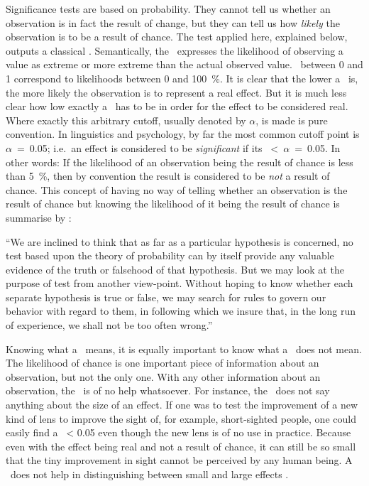 Significance tests are based on probability.
They cannot tell us whether an observation is in fact the result of change, but they can tell us how \emph{likely} the observation is to be a result of chance.
The test applied here, explained below, outputs a classical \pv.
Semantically, the \pv\ expresses the likelihood of observing a value as extreme or more extreme than the actual observed value.
\pv\ between 0 and 1 correspond to likelihoods between 0 and 100~\%.
It is clear that the lower a \pv\ is, the more likely the observation is to represent a real effect.
But it is much less clear how low exactly a \pv\ has to be in order for the effect to be considered real.
Where exactly this arbitrary cutoff, usually denoted by \(\alpha\), is made is pure convention.
In linguistics and psychology, by far the most common cutoff point is \(\alpha\)~=~0.05; i.e.~an effect is considered to be \emph{significant} if its \pv~<~\(\alpha\)~=~0.05.
In other words:
If the likelihood of an observation being the result of chance is less than 5~\%, then by convention the result is considered to be \emph{not} a result of chance.
This concept of having no way of telling whether an observation is the result of chance but knowing the likelihood of it being the result of chance is summarise by \citet[]{neyman_problem_1933}:

\begin{customquote}
``We are inclined to think that as far as a particular hypothesis is concerned, no test based upon the theory of probability can by itself provide any valuable evidence of the truth or falsehood of that hypothesis.
But we may look at the purpose of test from another view-point.
Without hoping to know whether each separate hypothesis is true or false, we may search for rules to govern our behavior with regard to them, in following which we insure that, in the long run of experience, we shall not be too often wrong.''
\end{customquote}

Knowing what a \pv\ means, it is equally important to know what a \pv\ does not mean.
The likelihood of chance is one important piece of information about an observation, but not the only one.
With any other information about an observation, the \pv\ is of no help whatsoever.
For instance, the \pv\ does not say anything about the size of an effect.
If one was to test the improvement of a new kind of lens to improve the sight of, for example, short-sighted people, one could easily find a \pv\ < 0.05 even though the new lens is of no use in practice.
Because even with the effect being real and not a result of chance, it can still be so small that the tiny improvement in sight cannot be perceived by any human being.
A \pv\ does not help in distinguishing between small and large effects \citep[]{frost_statistische_2017}.

